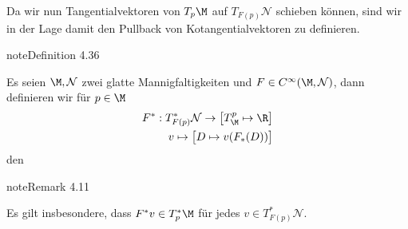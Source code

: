 \documentclass[letterpaper,10pt,english]{jupyterBook}
\begin{document}
\sphinxAtStartPar
Da wir nun Tangentialvektoren von \(T_p\M\) auf \(T_{F(p)}\mathcal{N}\) schieben können, sind wir in der Lage damit den Pullback von Kotangentialvektoren zu definieren.
\label{manifolds/diffformen:definition-13}
\begin{sphinxadmonition}{note}{Definition 4.36}



\sphinxAtStartPar
Es seien \(\M,\mathcal{N}\) zwei glatte Mannigfaltigkeiten und \(F\in C^\infty(\M,\mathcal{N})\), dann definieren wir für \(p\in\M\)
\begin{equation*}
\begin{split}F^\ast: T_{F(p)}^\ast\mathcal{N}\to \big[T^p_\M\mapsto\R\big]\\
v \mapsto \big[D\mapsto v(F_\ast(D)) \big]\end{split}
\end{equation*}
\sphinxAtStartPar
den 
\end{sphinxadmonition}
\label{manifolds/diffformen:remark-14}
\begin{sphinxadmonition}{note}{Remark 4.11}



\sphinxAtStartPar
Es gilt insbesondere, dass \(F^\ast v \in T_p^\ast\M\) für jedes \(v\in T_{F(p)}^\ast\mathcal{N}\).
\end{sphinxadmonition}
\end{document}
